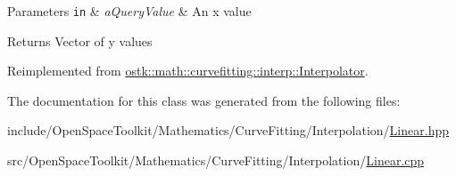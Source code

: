 \begin{DoxyParams}[1]{Parameters}
\mbox{\tt in}  & {\em a\+Query\+Value} & An x value \\
\hline
\end{DoxyParams}
\begin{DoxyReturn}{Returns}
Vector of y values 
\end{DoxyReturn}


Reimplemented from \hyperlink{classostk_1_1math_1_1curvefitting_1_1interp_1_1_interpolator_af678ba11fe02754aeaa821bc101fcd87}{ostk\+::math\+::curvefitting\+::interp\+::\+Interpolator}.



The documentation for this class was generated from the following files\+:\begin{DoxyCompactItemize}
\item 
include/\+Open\+Space\+Toolkit/\+Mathematics/\+Curve\+Fitting/\+Interpolation/\hyperlink{_linear_8hpp}{Linear.\+hpp}\item 
src/\+Open\+Space\+Toolkit/\+Mathematics/\+Curve\+Fitting/\+Interpolation/\hyperlink{_linear_8cpp}{Linear.\+cpp}\end{DoxyCompactItemize}
